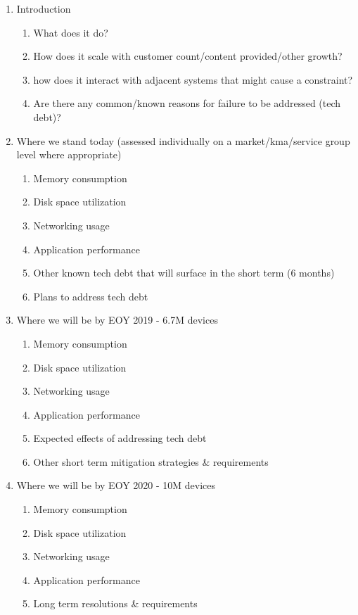 \documentclass{article}
\begin{document}
\begin{enumerate}
\item Introduction
  \begin{enumerate}
  \item What does it do? 
  \item How does it scale with customer count/content provided/other growth? 
  \item how does it interact with adjacent systems that might cause a constraint? 
  \item Are there any common/known reasons for failure to be addressed (tech debt)?
  \end{enumerate}
\item Where we stand today (assessed individually on a market/kma/service group level where appropriate) 
  \begin{enumerate}
  \item Memory consumption
  \item Disk space utilization
  \item Networking usage
  \item Application performance
  \item Other known tech debt that will surface in the short term (6 months)
  \item Plans to address tech debt
  \end{enumerate}
\item Where we will be by EOY 2019 - 6.7M devices
  \begin{enumerate}
  \item Memory consumption
  \item Disk space utilization
  \item Networking usage
  \item Application performance
  \item Expected effects of addressing tech debt
  \item Other short term mitigation strategies \& requirements 
  \end{enumerate}
\item Where we will be by EOY 2020 - 10M devices
  \begin{enumerate}
  \item ​Memory consumption
  \item Disk space utilization
  \item Networking usage
  \item Application performance​
  \item Long term resolutions \& requirements
  \end{enumerate}

\end{enumerate}
\end{document}
